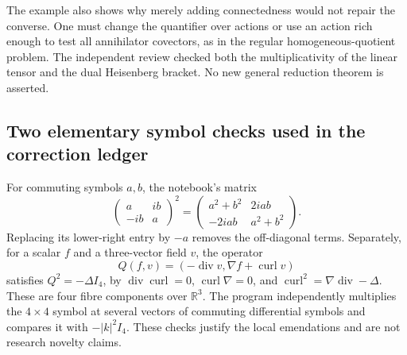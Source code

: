 The example also shows why merely adding connectedness would not repair the converse. One must change the quantifier over actions or use an action rich enough to test all annihilator covectors, as in the regular homogeneous-quotient problem. The independent review checked both the multiplicativity of the linear tensor and the dual Heisenberg bracket. No new general reduction theorem is asserted.

\subsection{Two elementary symbol checks used in the correction ledger}
\label{dev:symbols}

\begin{remark}\oursComputed
For commuting symbols \(a,b\), the notebook's matrix
\[
 \begin{pmatrix}a&ib\\-ib&a\end{pmatrix}^{\!2}
 =
 \begin{pmatrix}a^2+b^2&2iab\\-2iab&a^2+b^2\end{pmatrix}.
\]
Replacing its lower-right entry by \(-a\) removes the off-diagonal terms. Separately, for a scalar \(f\) and a three-vector field \(v\), the operator
\[
 Q(f,v)=(-\operatorname{div}v,\nabla f+\operatorname{curl}v)
\]
satisfies \(Q^2=-\Delta I_4\), by
\(\operatorname{div}\operatorname{curl}=0\),
\(\operatorname{curl}\nabla=0\), and
\(\operatorname{curl}^2=\nabla\operatorname{div}-\Delta\).
These are four fibre components over \(\mathbb R^3\). The program independently multiplies the \(4\times4\) symbol at several vectors of commuting differential symbols and compares it with \(-|k|^2I_4\). These checks justify the local emendations and are not research novelty claims.
\end{remark}
